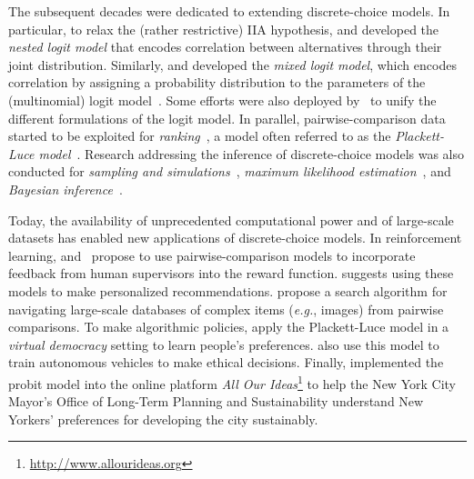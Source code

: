 The subsequent decades were dedicated to extending discrete-choice models.
In particular, to relax the (rather restrictive) IIA hypothesis, \citet{ben1973structure} and \citet{williams1977formation} developed the \emph{nested logit model} that encodes correlation between alternatives through their joint distribution.
Similarly, \citet{boyd1980effect} and \citet{cardell1980measuring} developed the \emph{mixed logit model}, which encodes correlation by assigning a probability distribution to the parameters of the (multinomial) logit model~\citep{hensher2003mixed}.
Some efforts were also deployed by~\citet{yellot1977relationship} to unify the different formulations of the logit model.
In parallel, pairwise-comparison data started to be exploited for \emph{ranking}~\citep{ford1957solution,buehlmann1963pairwise,plackett1975analysis,wauthier2013efficient,negahban2017rank}, a model often referred to as the \emph{Plackett-Luce model}~\citep{hensher2003mixed}.
Research addressing the inference of discrete-choice models was also conducted for \emph{sampling and simulations}~\citep{manski1981alternative,cosslett1981efficient}, \emph{maximum likelihood estimation}~\citep{hastie1998classification,hunter2004mm,maystre2015fast,vojnovic2016parameter}, and \emph{Bayesian inference}~\citep{guiver2009bayesian,caron2012efficient,houlsby2012collaborative}.

Today, the availability of unprecedented computational power and of large-scale datasets has enabled new applications of discrete-choice models.
In reinforcement learning, \citet{sadigh2017active} and~\citet{christiano2017deep} propose to use pairwise-comparison models to incorporate feedback from human supervisors into the reward function.
\citet{ammar2015ranked} suggests using these models to make personalized recommendations.
\citet{chumbalov2020scalable} propose a search algorithm for navigating large-scale databases of complex items (\textit{e.g.}, images) from pairwise comparisons.
To make algorithmic policies, \citet{lee2019webuildai} apply the Plackett-Luce model in a \emph{virtual democracy} setting to learn people's preferences.
\citet{noothigattu2018voting} also use this model to train autonomous vehicles to make ethical decisions.
Finally, \citet{salganik2015wiki} implemented the probit model into the online platform \emph{All Our Ideas}\footnote{\href{http://www.allourideas.org/planyc_example?guides=true}{http://www.allourideas.org}} to help the New York City Mayor’s Office of Long-Term Planning and Sustainability understand New Yorkers' preferences for developing the city sustainably.

